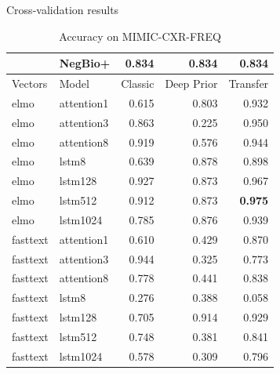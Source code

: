 \documentclass[pdf]{beamer}
\newcommand{\?}{\ensuremath{^\texttt{\bf [CITATION~NEEDED]}}}
\begin{document}
\begin{frame}{Cross-validation results}

\begin{table}
\caption{Accuracy on MIMIC-CXR-FREQ}
\label{mimic-freq-accuracy}
\small
\begin{tabular}{llrrr}
\toprule
 & NegBio+ & 0.834  & 0.834 & 0.834  \\
\midrule
Vectors &       Model        &  Classic &  Deep Prior &  Transfer \\
\midrule
                   elmo &        attention1 &    0.615 &       0.803 &    0.932 \\
                   elmo &        attention3 &    0.863 &       0.225 &    0.950 \\
                   elmo &        attention8 &    0.919 &       0.576 &    0.944 \\
                   elmo &             lstm8 &    0.639 &       0.878 &    0.898 \\
                   elmo &           lstm128 &    0.927 &       0.873 &    0.967 \\
                   elmo &           lstm512 &    0.912 &       0.873 &    \textbf{0.975} \\
                   elmo &          lstm1024 &    0.785 &       0.876 &    0.939 \\
               fasttext &        attention1 &    0.610 &       0.429 &    0.870 \\
               fasttext &        attention3 &    0.944 &       0.325 &    0.773 \\
               fasttext &        attention8 &    0.778 &       0.441 &    0.838 \\
               fasttext &             lstm8 &    0.276 &       0.388 &    0.058 \\
               fasttext &           lstm128 &    0.705 &       0.914 &    0.929 \\
               fasttext &           lstm512 &    0.748 &       0.381 &    0.841 \\
               fasttext &          lstm1024 &    0.578 &       0.309 &    0.796 \\
\bottomrule
\end{tabular}
\end{table}

\end{frame}
\end{document}
